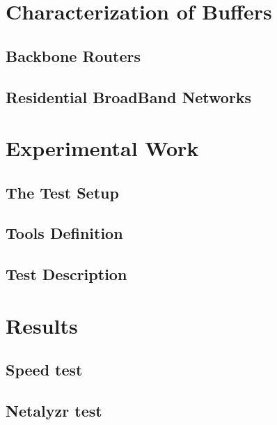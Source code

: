 \documentclass[letter, 11pt]{article}
\begin{document}
\newpage

\section{Characterization of Buffers}


\subsection{Backbone Routers}


\subsection{Residential BroadBand Networks}


\newpage

\section{Experimental Work}


\subsection{The Test Setup}


\subsection{Tools Definition}


\subsection{Test Description}


\newpage
\section{Results}


\subsection{Speed test}


\subsection{Netalyzr test}

\end{document}
